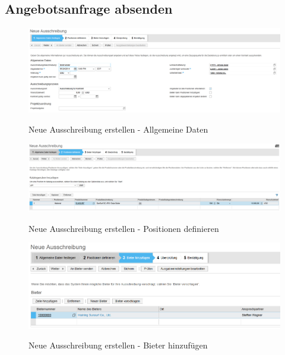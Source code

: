 \subsection{Angebotsanfrage absenden}
\label{sendrfq}

\begin{figure}[H]
	\begin{center}
	\includegraphics[width=1.0\textwidth]{grafiken/ByDesign-HowTo-Ausschreibung-1.png}
	\caption{Neue Ausschreibung erstellen - Allgemeine Daten}
	\vspace{-10pt}
	\label{abb:byd-newsupplier}
	\end{center}
\end{figure}
\begin{figure}[H]
	\begin{center}
	\includegraphics[width=1.0\textwidth]{grafiken/ByDesign-HowTo-Ausschreibung-2.png}
	\caption{Neue Ausschreibung erstellen - Positionen definieren}
	\vspace{-10pt}
	\label{abb:byd-newsupplier}
	\end{center}
\end{figure}
\begin{figure}[H]
	\begin{center}
	\includegraphics[width=1.0\textwidth]{grafiken/ByDesign-HowTo-Ausschreibung-3.png}
	\caption{Neue Ausschreibung erstellen - Bieter hinzufügen}
	\vspace{-10pt}
	\label{abb:byd-newsupplier}
	\end{center}
\end{figure}
